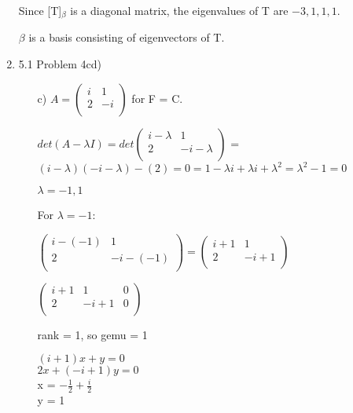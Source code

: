 \documentclass[12pt]{article}
\begin{document}
\begin{enumerate}
    Since [T]$_\beta$ is a diagonal matrix, the eigenvalues of T are $-3, 1, 1, 1$. 

    $\beta$ is a basis consisting of eigenvectors of T. 

    \item 5.1 Problem 4cd)
        \begin{enumerate}[label=(\alph*)]
            \item[c)] $A = \begin{pmatrix}
                i & 1 \\
                2 & -i \\
            \end{pmatrix}$ for F = C. 

            $det(A - \lambda I) = det\begin{pmatrix}
                i - \lambda & 1 \\
                2 & -i - \lambda \\
            \end{pmatrix}$
            = $(i - \lambda)(-i - \lambda) - (2) = 0 = 1 - \lambda i + \lambda i + \lambda^2= \lambda^2 - 1 = 0$
            
            $\lambda = -1, 1$ 

            For $\lambda  = -1$: 

            $\begin{pmatrix}
                i - (-1) & 1 \\
                2 & -i - (-1) \\
            \end{pmatrix} = \begin{pmatrix}
                i + 1 & 1 \\
                2 & -i + 1 \\
            \end{pmatrix}$

            $\begin{pmatrix}
                i + 1 & 1 & 0 \\
                2 & -i + 1 & 0 \\
            \end{pmatrix}$

            rank = 1, so gemu = 1

            $(i + 1)x + y = 0$ \\
            $2x + (-i + 1)y = 0$ \\ 

            x = $-\frac{1}{2} + \frac{i}{2}$ \\
            y = 1
            

\end{enumerate}
\end{enumerate}
\end{document}
